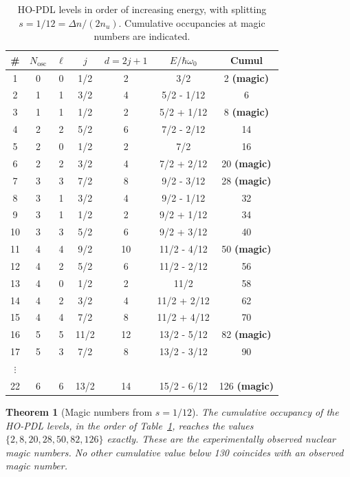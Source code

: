 \documentclass[12pt,a4paper]{article}
\newtheorem{theorem}{Theorem}[section]
\newcommand{\nuu}{n_u}
\newcommand{\Dn}{\Delta n}
\begin{document}
\begin{table}[H]
\centering
\caption{HO-PDL levels in order of increasing energy, with splitting $s = 1/12 = \Dn/(2\nuu)$. Cumulative occupancies at magic numbers are indicated.}
\label{tab:levels}
\begin{tabular}{ccccccc}
\toprule
\# & $N_{\mathrm{osc}}$ & $\ell$ & $j$ & $d=2j+1$ & $E/\hbar\omega_0$ & Cumul \\
\midrule
1  & 0 & 0 & 1/2  & 2  & 3/2         & 2   \quad\textbf{(magic)} \\
2  & 1 & 1 & 3/2  & 4  & 5/2 - 1/12  & 6   \\
3  & 1 & 1 & 1/2  & 2  & 5/2 + 1/12  & 8   \quad\textbf{(magic)} \\
4  & 2 & 2 & 5/2  & 6  & 7/2 - 2/12  & 14  \\
5  & 2 & 0 & 1/2  & 2  & 7/2         & 16  \\
6  & 2 & 2 & 3/2  & 4  & 7/2 + 2/12  & 20  \quad\textbf{(magic)} \\
7  & 3 & 3 & 7/2  & 8  & 9/2 - 3/12  & 28  \quad\textbf{(magic)} \\
8  & 3 & 1 & 3/2  & 4  & 9/2 - 1/12  & 32  \\
9  & 3 & 1 & 1/2  & 2  & 9/2 + 1/12  & 34  \\
10 & 3 & 3 & 5/2  & 6  & 9/2 + 3/12  & 40  \\
11 & 4 & 4 & 9/2  & 10 & 11/2 - 4/12 & 50  \quad\textbf{(magic)} \\
12 & 4 & 2 & 5/2  & 6  & 11/2 - 2/12 & 56  \\
13 & 4 & 0 & 1/2  & 2  & 11/2        & 58  \\
14 & 4 & 2 & 3/2  & 4  & 11/2 + 2/12 & 62  \\
15 & 4 & 4 & 7/2  & 8  & 11/2 + 4/12 & 70  \\
16 & 5 & 5 & 11/2 & 12 & 13/2 - 5/12 & 82  \quad\textbf{(magic)} \\
17 & 5 & 3 & 7/2  & 8  & 13/2 - 3/12 & 90  \\
$\vdots$ & & & & & & \\
22 & 6 & 6 & 13/2 & 14 & 15/2 - 6/12 & 126 \quad\textbf{(magic)} \\
\bottomrule
\end{tabular}
\end{table}

\begin{theorem}[Magic numbers from $s = 1/12$]
\label{thm:magic}
The cumulative occupancy of the HO-PDL levels, in the order of Table~\ref{tab:levels}, reaches the values $\{2, 8, 20, 28, 50, 82, 126\}$ exactly. These are the experimentally observed nuclear magic numbers. No other cumulative value below 130 coincides with an observed magic number.
\end{theorem}
\end{document}
